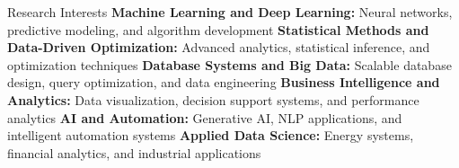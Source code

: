 \begin{rubric}{Research Interests}
\entry* \textbf{Machine Learning and Deep Learning:} Neural networks, predictive modeling, and algorithm development
\entry* \textbf{Statistical Methods and Data-Driven Optimization:} Advanced analytics, statistical inference, and optimization techniques
\entry* \textbf{Database Systems and Big Data:} Scalable database design, query optimization, and data engineering
\entry* \textbf{Business Intelligence and Analytics:} Data visualization, decision support systems, and performance analytics
\entry* \textbf{AI and Automation:} Generative AI, NLP applications, and intelligent automation systems
\entry* \textbf{Applied Data Science:} Energy systems, financial analytics, and industrial applications
\end{rubric}